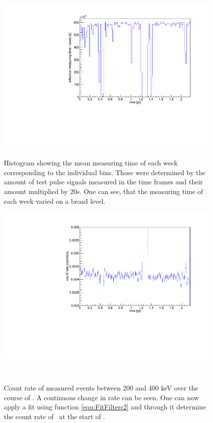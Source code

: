 \documentclass[encoding=utf8,british]{tumphthesis}
\begin{document}
\begin{figure}[t!]
	\centering
	\begin{minipage}[t]{.475\textwidth}
		\centering
		\includegraphics[width=\textwidth]{./Bilder/testpuler.pdf}
		\caption{
			Histogram showing the mean measuring time of each week corresponding to the individual bins.
			Those were determined by the amount of test pulse signals measured in the time frames and their amount multiplied by 20s.
			One can see, that the measuring time of each week varied on a broad level.
			}
		\label{fig:effectiveMeasuringTimes}
	\end{minipage}\hfill%
	\begin{minipage}[t]{.475\textwidth}
		\centering
		\includegraphics[width=\textwidth]{./Bilder/eventRate.pdf}
		\caption{
			Count rate of measured events between 200 and 400 keV over the course of \PII.
			A continuous change in rate can be seen. 
			One can now apply a fit using function \ref{equ:FitFilters2} and through it determine the count rate of \Kr\ at the start of \PII.
			}
		\label{fig:ChangeInEventRate}
	\end{minipage}
	\\
\end{figure}
\end{document}
